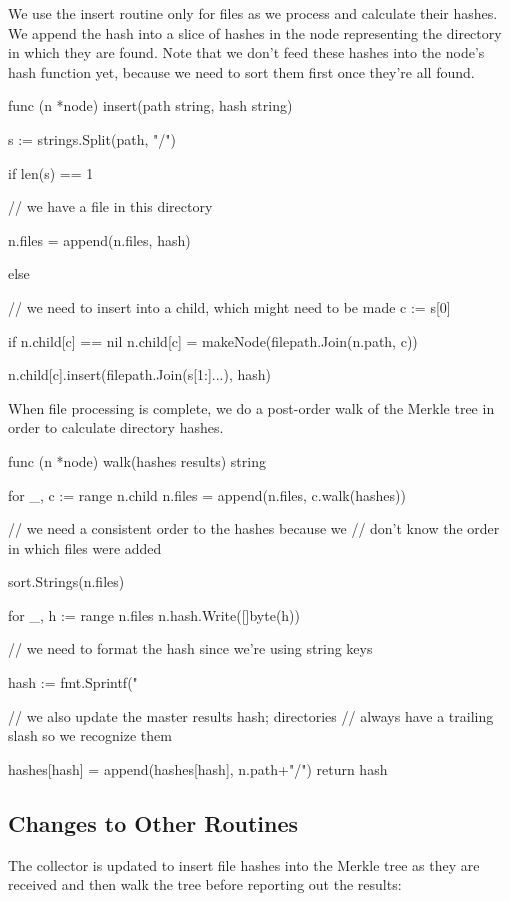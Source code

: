\documentclass[12pt,notitlepage]{article}
\begin{document}
We use the insert routine only for files as we process and calculate their
hashes. We append the hash into a slice of hashes in the node representing
the directory in which they are found. Note that we don't feed these hashes
into the node's hash function yet, because we need to sort them first once
they're all found.

\begin{golang}
func (n *node) insert(path string, hash string) {
	s := strings.Split(path, "/")

	if len(s) == 1 {
		// we have a file in this directory

		n.files = append(n.files, hash)
	} else {
		// we need to insert into a child, which might need to be made
		c := s[0]

		if n.child[c] == nil {
			n.child[c] = makeNode(filepath.Join(n.path, c))
		}

		n.child[c].insert(filepath.Join(s[1:]...), hash)
	}
}
\end{golang}

When file processing is complete, we do a post-order walk of the Merkle
tree in order to calculate directory hashes.

\begin{golang}
func (n *node) walk(hashes results) string {
	for _, c := range n.child {
		n.files = append(n.files, c.walk(hashes))
	}

	// we need a consistent order to the hashes because we
	// don't know the order in which files were added

	sort.Strings(n.files)

	for _, h := range n.files {
		n.hash.Write([]byte(h))
	}

	// we need to format the hash since we're using string keys

	hash := fmt.Sprintf("%

	// we also update the master results hash; directories
	// always have a trailing slash so we recognize them

	hashes[hash] = append(hashes[hash], n.path+"/")
	return hash
}
\end{golang}

\subsection{Changes to Other Routines}
The collector is updated to insert file hashes into the Merkle tree as they
are received and then walk the tree before reporting out the results:
\end{document}
